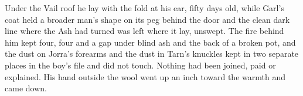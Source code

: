 Under the Vail roof he lay with the fold at his ear, fifty days old, while Garl's coat held a broader man's shape on its peg behind the door and the clean dark line where the Ash had turned was left where it lay, unswept. The fire behind him kept four, four and a gap under blind ash and the back of a broken pot, and the dust on Jorra's forearms and the dust in Tarn's knuckles kept in two separate places in the boy's file and did not touch. Nothing had been joined, paid or explained. His hand outside the wool went up an inch toward the warmth and came down.
